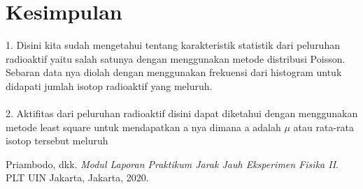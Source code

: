 \documentclass{article}
\begin{document}
	\section{Kesimpulan}
	
	1. Disini kita sudah mengetahui tentang karakteristik statistik dari peluruhan radioaktif yaitu salah satunya dengan menggunakan metode distribusi Poisson. Sebaran data nya diolah dengan menggunakan frekuensi dari histogram untuk didapati jumlah isotop radioaktif yang meluruh. \\ \\
	2. Aktifitas dari peluruhan radioaktif disini dapat diketahui dengan menggunakan metode least square untuk mendapatkan a nya dimana a adalah $\mu$ atau rata-rata isotop tersebut meluruh
		
	\begin{thebibliography}{9}
		Priambodo, dkk. 
		\textit{Modul Laporan Praktikum Jarak Jauh Eksperimen Fisika II}. 
		PLT UIN Jakarta, Jakarta, 2020.
	\end{thebibliography}
	
\end{document}
